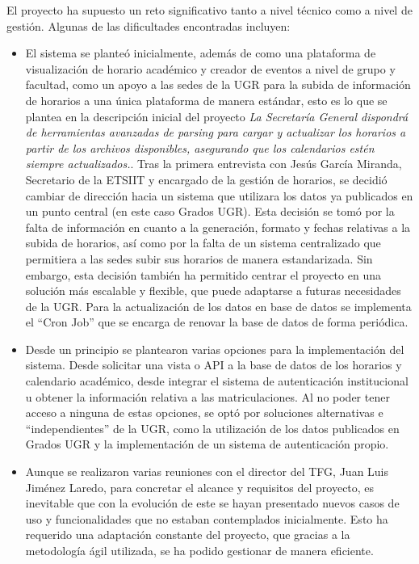 El proyecto ha supuesto un reto significativo tanto a nivel técnico como a nivel de gestión. Algunas de las dificultades encontradas incluyen:
\begin{itemize}
    \item El sistema se planteó inicialmente, además de como una plataforma de visualización de horario académico y creador de eventos a nivel de grupo y facultad, como un apoyo a las sedes de la UGR para la subida de información de horarios a una única plataforma de manera estándar, esto es lo que se plantea en la descripción inicial del proyecto \textit{La Secretaría General dispondrá de herramientas avanzadas de parsing para cargar y actualizar los horarios a partir de los archivos disponibles, asegurando que los calendarios estén siempre actualizados.}. Tras la primera entrevista con Jesús García Miranda, Secretario de la ETSIIT y encargado de la gestión de horarios, se decidió cambiar de dirección hacia un sistema que utilizara los datos ya publicados en un punto central (en este caso Grados UGR).
    Esta decisión se tomó por la falta de información en cuanto a la generación, formato y fechas relativas a la subida de horarios, así como por la falta de un sistema centralizado que permitiera a las sedes subir sus horarios de manera estandarizada.
    Sin embargo, esta decisión también ha permitido centrar el proyecto en una solución más escalable y flexible, que puede adaptarse a futuras necesidades de la UGR. Para la actualización de los datos en base de datos se implementa el ``Cron Job'' que se encarga de renovar la base de datos de forma periódica.

    \item Desde un principio se plantearon varias opciones para la implementación del sistema. Desde solicitar una vista o API a la base de datos de los horarios y calendario académico, desde integrar el sistema de autenticación institucional u obtener la información relativa a las matriculaciones. Al no poder tener acceso a ninguna de estas opciones, se optó por soluciones alternativas e ``independientes'' de la UGR, como la utilización de los datos publicados en Grados UGR y la implementación de un sistema de autenticación propio.
    \item Aunque se realizaron varias reuniones con el director del TFG, Juan Luis Jiménez Laredo, para concretar el alcance y requisitos del proyecto, es inevitable que con la evolución de este se hayan presentado nuevos casos de uso y funcionalidades que no estaban contemplados inicialmente. Esto ha requerido una adaptación constante del proyecto, que gracias a la metodología ágil utilizada, se ha podido gestionar de manera eficiente.
\end{itemize}

